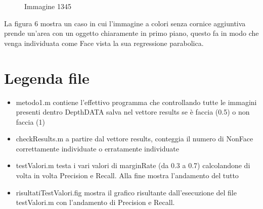 \documentclass[
  italian,
]{article}
\providecommand{\tightlist}{%
  \setlength{\itemsep}{0pt}\setlength{\parskip}{0pt}}
\begin{document}
\begin{figure}
\centering
{}%
\qquad
{}%
\qquad
{}%
\caption{Immagine 1345}
\end{figure}
La figura 6 mostra un caso in cui l'immagine a colori senza cornice aggiuntiva prende un'area con un oggetto chiaramente in primo piano, questo fa in modo che venga individuata come Face vista la sua regressione parabolica.

\hypertarget{legenda-file}{%
\section{Legenda file}\label{legenda-file}}

\begin{itemize}
\tightlist
\item
  metodo1.m contiene l'effettivo programma che controllando tutte le
  immagini presenti dentro DepthDATA salva nel vettore results se è
  faccia (0.5) o non faccia (1)
\item
  checkResults.m a partire dal vettore results, conteggia il numero di
  NonFace correttamente individuate o erratamente individuate
\item
  testValori.m testa i vari valori di marginRate (da 0.3 a 0.7)
  calcolandone di volta in volta Precision e Recall. Alla fine mostra
  l'andamento del tutto
\item
  risultatiTestValori.fig mostra il grafico risultante dall'esecuzione
  del file testValori.m con l'andamento di Precision e Recall.
\end{itemize}
\end{document}
